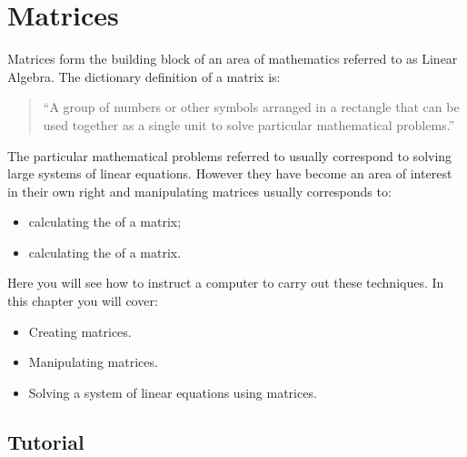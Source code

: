 \chapter{Matrices}
\label{chp:matrices}

Matrices form the building block of an area of mathematics referred to as Linear
Algebra. The dictionary definition of a matrix is:

\begin{quote}
``A group of numbers or other symbols arranged in a rectangle that can be used
together as a single unit to solve particular mathematical problems.''
\end{quote}


The particular mathematical problems referred to usually correspond to solving large
systems of linear equations. However they have become an area of interest in
their own right and manipulating matrices usually corresponds to:
\begin{itemize}
\item 

calculating the  of a matrix;

\item 

calculating the  of a matrix.

\end{itemize}


Here you will see how to instruct a computer to carry out these techniques.
In this chapter you will cover:

\begin{itemize}
\item 

Creating matrices.

\item 

Manipulating matrices.

\item 

Solving a system of linear equations using matrices.

\end{itemize}





\section{Tutorial}
\label{\detokenize{tools-for-mathematics/04-matrices/tutorial/main:tutorial}}\label{\detokenize{tools-for-mathematics/04-matrices/tutorial/main::doc}}


